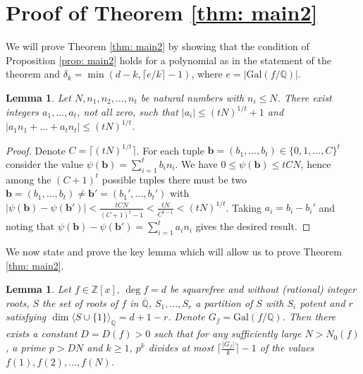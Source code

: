 \documentclass[alphabetic]{amsart}
\newtheorem{lem}[claim]{Lemma}
\theoremstyle{definition}
\numberwithin{equation}{section}
\newcommand{\Z}{{\mathbb Z}}
\newcommand{\Q}{{\mathbb Q}}
\newcommand{\Qb}{{\overline{\Q}}}
\newcommand{\Gal}{{\mathrm{Gal}}}
\numberwithin{equation}{section}
\begin{document}
\section{Proof of Theorem \ref{thm: main2}}

We will prove Theorem \ref{thm: main2} by showing that the condition of Proposition \ref{prop: main2} holds for a polynomial as in the statement of the theorem and $\delta_k=\min(d-k,\lceil e/k\rceil-1)$, where $e=|\Gal(f/\Q)|$.

\begin{lem}\label{lem: int comb} Let $N,n_1,n_2,\ldots,n_t$ be natural numbers with $n_i\le N$. There exist integers $a_1,\ldots,a_t$, not all zero, such that $|a_i|\le (tN)^{1/t}+1$ and $|a_1n_1+\ldots+a_tn_t|\le (tN)^{1/t}$.\end{lem}

\begin{proof} Denote $C=\lceil(tN)^{1/t}\rceil$. For each tuple $\mathbf b=(b_1,\ldots,b_t)\in\{0,1,\ldots,C\}^t$ consider the value $\psi(\mathbf b)=\sum_{i=1}^tb_in_i$. We have $0\le\psi(\mathbf b)\le tCN$, hence among the $(C+1)^t$ possible tuples there must be two $\mathbf b=(b_1,\ldots,b_t)\neq\mathbf b'=(b_1',\ldots,b_t')$ with 
$|\psi(\mathbf b)-\psi(\mathbf b')|<\frac{tCN}{(C+1)^t-1}<\frac{tN}{C^{t-1}}<(tN)^{1/t}$. Taking $a_i=b_i-b_i'$ and noting that $\psi(\mathbf b)-\psi(\mathbf b')=\sum_{i=1}^ta_in_i$ gives the desired result.\end{proof}

We now state and prove the key lemma which will allow us to prove Theorem \ref{thm: main2}.

\begin{lem}\label{lem: pre lem main2} Let $f\in\Z[x],\,\deg f=d$ be squarefree and without (rational) integer roots, $S$ the set of roots of $f$ in $\Qb$, $S_1,\ldots,S_r$ a partition of $S$ with $S_i$ potent and $r$ satisfying $\dim\langle S\cup\{1\}\rangle_\Q=d+1-r$. Denote $G_f=\Gal(f/\Q)$.
Then there exists a constant $D=D(f)>0$ such that for any sufficiently large $N> N_0(f)$, a prime $p>DN$ and $k\ge 1$, $p^k$ divides at most
$\big\lceil\frac{|G_f|}k\big\rceil-1$ of the values $f(1),f(2),\ldots,f(N)$.
\end{lem}
\end{document}
